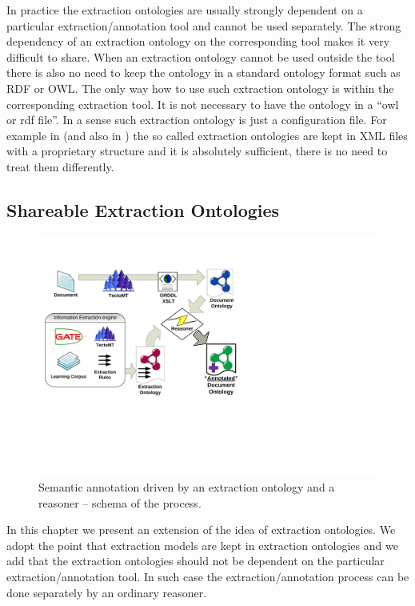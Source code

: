 In practice the extraction ontologies are usually strongly dependent on a particular extraction/annotation tool and cannot be used separately. The strong dependency of an extraction ontology on the corresponding tool makes it very difficult to share. When an extraction ontology cannot be used outside the tool there is also no need to keep the ontology in a standard ontology format such as RDF or OWL. The only way how to use such extraction ontology is within the corresponding extraction tool. It is not necessary to have the ontology in a ``owl or rdf file''. In a sense such extraction ontology is just a configuration file. For example in \citep{springerlink:10.1007/978-3-642-01891-6_5} %
 (and also in \citep{DBLP:conf/er/EmbleyTL02}) the so called extraction ontologies are kept in XML files with a proprietary structure and it is absolutely sufficient, there is no need to treat them differently.



\subsection{Shareable Extraction Ontologies}



\begin{figure}
\centerline{\includegraphics[angle=-90, width=0.7\hsize]{semantic_rules_app_schema}}
\caption{Semantic annotation driven by an extraction ontology and a reasoner -- schema of the process.}
\label{img:rules_app_schema}
\end{figure}


In this chapter we present an extension of the idea of extraction ontologies. We adopt the point that extraction models are kept in extraction ontologies and we add that the extraction ontologies should not be dependent on the particular extraction/annotation tool. In such case the extraction/annotation process can be done separately by an ordinary reasoner.


